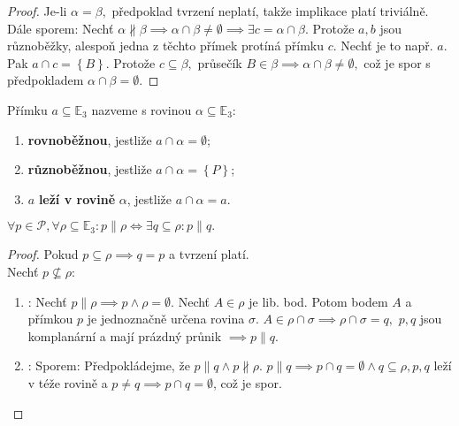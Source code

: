 \begin{proof}
    Je-li $\alpha = \beta,$ předpoklad tvrzení neplatí, takže implikace platí
    triviálně. \\
    Dále sporem: Nechť $\alpha \nparallel \beta \implies \alpha \cap \beta \ne
    \emptyset \implies \exists c = \alpha \cap \beta.$ Protože $a,b$ jsou různoběžky,
    alespoň jedna z těchto přímek protíná přímku $c.$ Nechť je to např. $a.$ Pak
    $a \cap c = \left \{ B \right \} .$ Protože $c\subseteq \beta,$ průsečík
    $B\in \beta \implies \alpha \cap \beta \ne \emptyset,$ což je spor s předpokladem
    $\alpha \cap \beta = \emptyset.$
\end{proof}

\begin{definition}
    Přímku $a \subseteq \mathbb E_3$ nazveme s rovinou $\alpha \subseteq \mathbb E_3:$
    \begin{enumerate}[$i.$]
        \item \textbf{rovnoběžnou}, jestliže $a\cap \alpha = \emptyset$;
        \item \textbf{různoběžnou}, jestliže $a\cap \alpha = \left \{ P \right \} $;
        \item $a$ \textbf{leží v rovině} $\alpha$, jestliže $a \cap \alpha = a$.
    \end{enumerate}
\end{definition}

\begin{veta}
    $\forall p \in \mathscr P, \forall \rho \subseteq \mathbb E_3: p \parallel \rho
    \iff \exists q\subseteq \rho: p\parallel q.$
\end{veta}

\begin{proof}
    Pokud $p \subseteq \rho \implies q=p$ a tvrzení platí.\\
    Nechť $p\not \subseteq \rho:$
    \begin{enumerate}[$i.$]
        \item \uv{$\implies$}: Nechť $p\parallel\rho\implies p\land \rho=\emptyset.$
        Nechť $A\in\rho$ je lib. bod. Potom bodem $A$ a přímkou $p$ je jednoznačně
        určena rovina $\sigma.$ $A\in \rho\cap\sigma \implies \rho\cap\sigma=q,$
        $p,q$ jsou komplanární a mají prázdný průnik $\implies p\parallel q.$
        \item \uv{$\impliedby$}: Sporem: Předpokládejme, že $p\parallel q \land
        p\nparallel \rho.$ $p\parallel q \implies p\cap q=\emptyset\land q\subseteq \rho,
        p,q$ leží v téže rovině a $p\ne q\implies p\cap q = \emptyset$, což je spor.
    \end{enumerate}
\end{proof}


